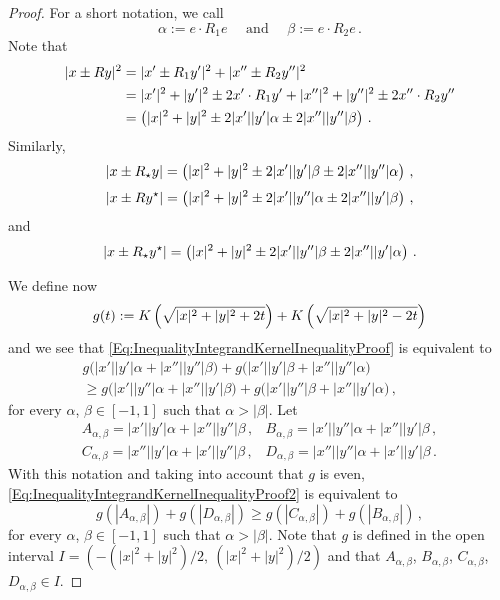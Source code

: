 \begin{proof}
For a short notation, we call
$$
\alpha := e \cdot R_1 e  \quad \text{ and } \quad \beta := e \cdot R_2 e\,.
$$
Note that
\begin{align*}
|x \pm Ry|^2&= |x' \pm R_1y'|^2 + |x'' \pm R_2y''|^2 \\
&= |x'|^2 + |y'|^2 \pm 2 x'\cdot R_1 y' +  |x''|^2 + |y''|^2 \pm 2 x''\cdot R_2 y''\\
&= \left ( { |x|^2 + |y|^2 \pm 2 |x'||y'| \alpha \pm 2 |x''||y''| \beta}\right )\,.
\end{align*}
Similarly,
$$
|x \pm R_\star y| = \left ( { |x|^2 + |y|^2 \pm 2 |x'||y'| \beta \pm 2 |x''||y''|\alpha}\right )\,,
$$
$$
|x \pm R y^\star| = \left ( { |x|^2 + |y|^2 \pm 2 |x'||y''| \alpha \pm 2 |x''||y'|\beta}\right )\,,
$$
and
$$
|x \pm R_\star y^\star| = \left ( { |x|^2 + |y|^2 \pm 2 |x'||y''| \beta \pm 2 |x''||y'| \alpha}\right )\,.
$$

We define now
$$
g(t) := K \left ( {\sqrt{|x|^2 + |y|^2 + 2 t}}\right ) + K \left ( {\sqrt{|x|^2 + |y|^2 - 2 t}}\right )
$$
and we see that \eqref{Eq:InequalityIntegrandKernelInequalityProof} is equivalent to
\begin{equation}
\label{Eq:InequalityIntegrandKernelInequalityProof2}
\begin{split}
g\Big(|x'||y'| \alpha + |x''||y''| \beta \Big)
+ g\Big(|x'||y'| \beta + |x''||y''| \alpha \Big) \hspace{2cm}
\\ \geq
g\Big(|x'||y''| \alpha + |x''||y'|\beta \Big)
+ g\Big(|x'||y''| \beta + |x''||y'| \alpha \Big)\,,
\end{split}
\end{equation}
for every $\alpha$, $\beta \in [-1,1]$ such that $\alpha > |\beta|$. Let
$$
\begin{array}{cc}
A_{\alpha,\beta} = |x'||y'|  \alpha + |x''||y''|\beta \,, &
B_{\alpha,\beta} = |x'||y''| \alpha + |x''||y'| \beta \,, \\
C_{\alpha,\beta} = |x''||y'| \alpha + |x'||y''| \beta \,, &
D_{\alpha,\beta} = |x''||y''|\alpha + |x'||y'|  \beta \,.
\end{array}
$$
With this notation and taking into account that $g$ is even,
\eqref{Eq:InequalityIntegrandKernelInequalityProof2} is equivalent to
\begin{equation}
\label{Eq:InequalityIntegrandKernelInequalityProof3}
g(|A_{\alpha,\beta}|) + g(|D_{\alpha,\beta}|) \geq g(|C_{\alpha,\beta}|) + g(|B_{\alpha,\beta}|)\,,
\end{equation}
for every $\alpha$, $\beta \in [-1,1]$ such that $\alpha > |\beta|$. Note that $g$ is defined in the open interval $I = (-(|x|^2 + |y|^2)/2,\ (|x|^2 + |y|^2)/2)$ and that $A_{\alpha,\beta}$, $B_{\alpha,\beta}$, $C_{\alpha,\beta}$, $D_{\alpha,\beta} \in I$.


\end{proof}
